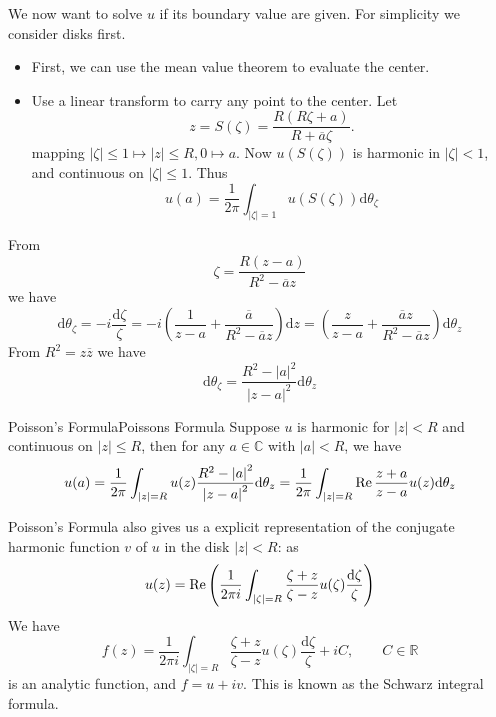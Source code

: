 \documentclass[../main.tex]{subfiles}
\begin{document}
We now want to solve $u$ if its boundary value are given. For simplicity we consider disks first.
\begin{itemize}
	\item First, we can use the mean value theorem to evaluate the center.
	\item Use a linear transform to carry any point to the center. Let
		\begin{equation}
			z = S(\zeta) = \frac{R(R \zeta+a)}{R+\overline{a}\zeta}.
		\end{equation}
		mapping $\left|\zeta\right|\leq 1 \mapsto \left|z\right|\leq R, 0 \mapsto a$. Now $u(S(\zeta))$ is harmonic in $\left|\zeta\right|<1$, and continuous on $\left|\zeta\right|\leq 1$. Thus
		\begin{equation*}
			u(a) = \frac{1}{2 \pi}\int_{\left|\zeta\right|=1} u(S(\zeta)) \mathrm{d} \theta_{\zeta}
		\end{equation*}
\end{itemize}
From
\begin{equation*}
	\zeta = \frac{R(z-a)}{R^2-\overline{a}z}
\end{equation*}
we have
\begin{equation*}
	\mathrm{d} \theta_{\zeta} = -i \frac{\mathrm{d} \zeta}{\zeta} = -i \left(\frac{1}{z-a} + \frac{\overline{a}}{R^2-\overline{a}z}\right) \mathrm{d} z = \left(\frac{z}{z-a} + \frac{\overline{a}z}{R^2-\overline{a}z}\right) \mathrm{d} \theta_z
\end{equation*}
From $R^2 = z \overline{z}$ we have
\begin{equation*}
	\mathrm{d} \theta_{\zeta} = \frac{R^2-\left|a\right|^2}{\left|z-a\right|^2} \mathrm{d} \theta_z
\end{equation*}

\begin{theorem}{Poisson's Formula}{Poissons Formula}
	Suppose $u$ is harmonic for $\left|z\right|<R$ and continuous on $\left|z\right|\leq R$, then for any $a\in \mathbb{C}$ with $\left|a\right|<R$, we have
	\begin{equation}
		u(a) = \frac{1}{2 \pi} \int_{\left|z\right|=R} u(z) \frac{R^2-\left|a\right|^2}{\left|z-a\right|^2} \mathrm{d} \theta_z = \frac{1}{2 \pi } \int_{\left|z\right|=R} \operatorname{Re} \frac{z+a}{z-a} u(z) \mathrm{d} \theta_z
	\end{equation}
\end{theorem}
Poisson's Formula also gives us a explicit representation of the conjugate harmonic function $v$ of $u$ in the disk $\left|z\right|<R$: as
\begin{equation*}
	u(z) = \operatorname{Re} \left(\frac{1}{2 \pi i} \int_{\left|\zeta\right|=R} \frac{\zeta+z}{\zeta-z} u(\zeta) \frac{\mathrm{d} \zeta}{\zeta}\right)
\end{equation*}
We have
\begin{equation}
	f(z) = \frac{1}{2 \pi i} \int_{\left|\zeta\right|=R} \frac{\zeta+z}{\zeta-z} u(\zeta) \frac{\mathrm{d} \zeta}{\zeta} + i C, \qquad  C\in \mathbb{R}
\end{equation}
is an analytic function, and $f=u+iv$. This is known as the Schwarz integral formula.
\end{document}
